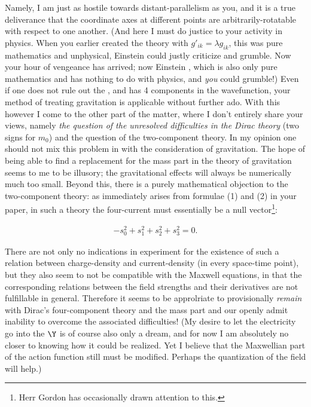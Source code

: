 \documentclass{article}
\newcommand{\uequ}[1]{
\begin{align*}
#1
\end{align*}
}
\begin{document}
Namely, I am just as hostile towards distant-parallelism as you, and it is a true deliverance that  the coordinate axes at different points are arbitrarily-rotatable with respect to one another. (And here I must do justice to your activity in physics. When you earlier created the theory with $g'_{ik}=\lambda g_{ik}$, this was pure mathematics and unphysical, Einstein could justly criticize and grumble. Now your hour of vengeance has arrived; now Einstein , which is also only pure mathematics and has nothing to do with physics, and \textit{you} could grumble!) Even if one does not rule out the , and has 4 components in the wavefunction, your method of treating gravitation is applicable without further ado. With this however I come to the other part of the matter, where I don't entirely share your views, namely \textit{the question of the unresolved difficulties in the Dirac theory} (two signs for $m_0$) and the question of the two-component theory. In my opinion one should not mix this problem in with the consideration of gravitation. The hope of being able to find a replacement for the mass part in the theory of gravitation seems to me to be illusory; the gravitational effects will always be numerically much too small. Beyond this, there is a purely mathematical objection to the two-component theory: as immediately arises from formulae (1) and (2) in your paper, in such a theory the four-current must essentially be a null vector\footnote{Herr Gordon has occasionally drawn attention to this.}:
\uequ{
-s_0^2 + s_1^2 + s_2^2 + s_3^2 = 0.
}

There are not only no indications in experiment for the existence of such a relation between charge-density and current-density (in every space-time point), but they also seem to not be compatible with the Maxwell equations, in that the corresponding relations between the field strengths and their derivatives are not fulfillable in general. Therefore it seems to be approlriate to provisionally \textit{remain} with Dirac's four-component theory and the mass part and our openly admit inability to overcome the associated difficulties! (My desire to let the electricity go into the $\Y$ is of course also only a dream, and for now I am absolutely no closer to knowing how it could be realized. Yet I believe that the Maxwellian part of the action function still must be modified. Perhaps the quantization of the field will help.)
\end{document}
